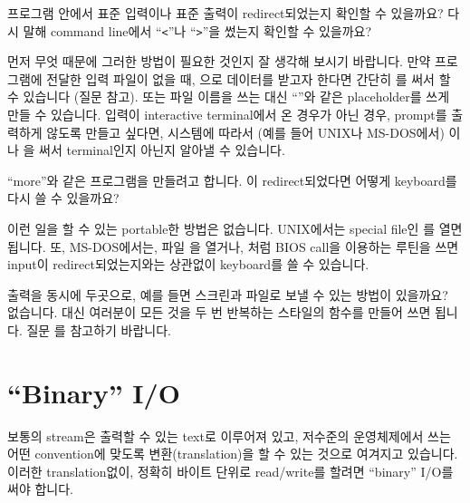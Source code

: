 \begin{faq}
	프로그램 안에서 표준 입력이나 표준 출력이 redirect되었는지
	확인할 수 있을까요?  다시 말해 command line에서 ``\verb+<+''나
	``\verb+>+''을 썼는지 확인할 수 있을까요?

\A
	먼저 무엇 때문에 그러한 방법이 필요한 것인지 잘 생각해 보시기
	바랍니다.  만약 프로그램에 전달한 입력 파일이 없을 때,
	으로 데이터를 받고자 한다면 간단히 를 써서
	할 수 있습니다 (질문  참고).
	또는 파일 이름을 쓰는 대신 ``\TT{-}''와 같은 placeholder를
	쓰게 만들 수 있습니다.  입력이 interactive terminal에서 온 경우가
	아닌 경우, prompt를 출력하게 않도록 만들고 싶다면, 시스템에 따라서
	(예를 들어 UNIX나 MS-DOS에서) 이나
	을 써서 terminal인지 아닌지 알아낼 수 
	있습니다.
\end{faq}

\begin{faq}
	``more''와 같은 프로그램을 만들려고 합니다.
	이 redirect되었다면 어떻게 keyboard를
	다시 쓸 수 있을까요?

\A
	이런 일을 할 수 있는 portable한 방법은 없습니다.
	UNIX에서는 special file인 를 열면 됩니다.
        또, MS-DOS에서는, 파일 을 열거나, 처럼
	BIOS call을 이용하는 루틴을 쓰면 input이 redirect되었는지와는
	상관없이 keyboard를 쓸 수 있습니다.
\end{faq}


\begin{faq}
	출력을 동시에 두곳으로, 예를 들면 스크린과 파일로 보낼 수 있는
	방법이 있을까요?
\A
	없습니다.  대신 여러분이 모든 것을 두 번 반복하는  스타일의
	함수를 만들어 쓰면 됩니다.  질문 를 참고하기 바랍니다.
\end{faq}

\section{``Binary'' I/O}	\label{sec:binio}
보통의 stream은 출력할 수 있는 text로 이루어져 있고,
저수준의 운영체제에서 쓰는 어떤 convention에 맞도록 변환(translation)을
할 수 있는 것으로 여겨지고 있습니다.
이러한 translation없이, 정확히 바이트 단위로 read/write를 할려면
``binary'' I/O를 써야 합니다.

